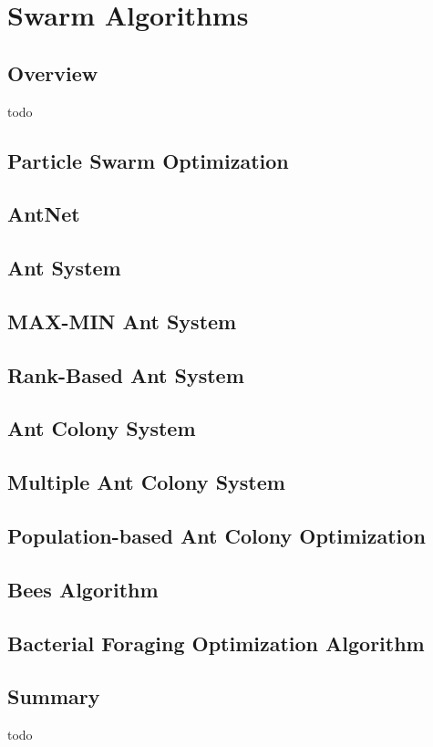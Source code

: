 


\chapter{Swarm Algorithms}
\label{ch:swarm}

\section{Overview}
todo



\section{Particle Swarm Optimization}
\section{AntNet}
\section{Ant System}
\section{MAX-MIN Ant System}
\section{Rank-Based Ant System}
\section{Ant Colony System}
\section{Multiple Ant Colony System}
\section{Population-based Ant Colony Optimization}
\section{Bees Algorithm}
\section{Bacterial Foraging Optimization Algorithm}

\section{Summary}
todo
